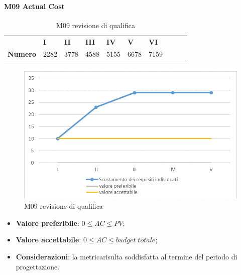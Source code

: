 \paragraph{M09 Actual Cost} \mbox{}
\begin{longtable}[H!] {						
		>{}p{50mm}  		
		>{}p{8mm}
		>{}p{8mm}		
		>{}p{8mm}		
		>{}p{8mm}		
		>{}p{8mm}		
		>{}p{8mm}
		>{}p{8mm}
		>{}p{8mm}
		>{}p{8mm}
	}
	\rowcolor{gray!50}
	\textbf{} & \textbf{I} & \textbf{II} & \textbf{III} & \textbf{IV} & \textbf{V} & \textbf{VI} \TBstrut \\ [2mm]
	\textbf{Numero} & 2282 & 3778 & 4588 & 5155 & 6678 & 7159 \TBstrut \\ [2mm]
	\rowcolor{white}
	\caption{M09 revisione di qualifica}
\end{longtable}
\begin{figure}[H] 	
	\includegraphics[width=\linewidth]{./img/grafici/RP1.png}	
	\caption{M09 revisione di qualifica}	
\end{figure}
\begin{itemize}
	\item \textbf{Valore preferibile}: $0\le AC \le PV$;
	\item \textbf{Valore accettabile}: $0 \le AC \le budget \; totale$;
	\item \textbf{Considerazioni}: la metrica\glosp risulta soddisfatta al termine del periodo di progettazione\glo.
\end{itemize}

